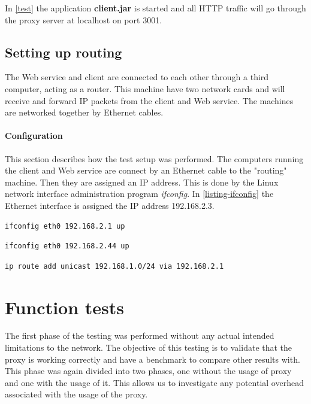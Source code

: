 In \cref{test} the application \textbf{client.jar} is started and all HTTP
traffic will go through the proxy server at localhost on port 3001.

\subsection{Setting up routing}

 The Web service and client are connected to each other through a third
 computer, acting as a router. This machine have two network cards and will
 receive and forward IP packets from the client and Web service. The machines
 are networked together by Ethernet cables.

\paragraph{Configuration}

This section describes how the test setup was performed. The computers running
the client and Web service are connect by an Ethernet cable to the "routing"
machine. Then they are assigned an IP address. This is done by the Linux network
interface administration program \textit{ifconfig}. In \cref{listing-ifconfig}
the Ethernet interface is assigned the IP address 192.168.2.3.

\begin{lstlisting}[frame=single, caption="Configuring a network interface of the router", label=listing-ifconfig]
ifconfig eth0 192.168.2.1 up
\end{lstlisting}


\begin{lstlisting}[frame=single, caption="Configuring a network interface of client", label=listing-ifconfig]
ifconfig eth0 192.168.2.44 up
\end{lstlisting}

\begin{lstlisting}[frame=single, caption="Configuring routing rules for the client", label=listing-ifconfig]
ip route add unicast 192.168.1.0/24 via 192.168.2.1
\end{lstlisting}


\section{Function tests}

The first phase of the testing was performed without any actual intended
limitations to the network. The objective of this testing is to validate that
the proxy is working correctly and have a benchmark to compare other results
with. This phase was again divided into two phases, one without the usage of
proxy and one with the usage of it. This allows us to investigate any potential
overhead associated with the usage of the proxy.

